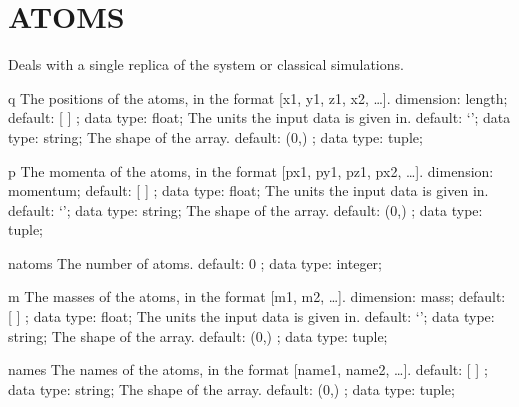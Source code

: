 \section{ATOMS}
\label{ATOMS}
\begin{ipifield}{}%
{Deals with a single replica of the system or classical simulations.}%
{}%
{}
\begin{ipifield}{q}%
{The positions of the atoms, in the format [x1, y1, z1, x2, \ldots  ].}%
{dimension: length; default:  [ ] ; data type: float; }%
{%
{The units the input data is given in.}%
{default: `'; data type: string; }%
%
{The shape of the array.}%
{default:  (0,) ; data type: tuple; }%
}
\end{ipifield}
\begin{ipifield}{p}%
{The momenta of the atoms, in the format [px1, py1, pz1, px2, \ldots  ].}%
{dimension: momentum; default:  [ ] ; data type: float; }%
{%
{The units the input data is given in.}%
{default: `'; data type: string; }%
%
{The shape of the array.}%
{default:  (0,) ; data type: tuple; }%
}
\end{ipifield}
\begin{ipifield}{natoms}%
{The number of atoms.}%
{default:  0 ; data type: integer; }%
{}
\end{ipifield}
\begin{ipifield}{m}%
{The masses of the atoms, in the format [m1, m2, \ldots  ].}%
{dimension: mass; default:  [ ] ; data type: float; }%
{%
{The units the input data is given in.}%
{default: `'; data type: string; }%
%
{The shape of the array.}%
{default:  (0,) ; data type: tuple; }%
}
\end{ipifield}
\begin{ipifield}{names}%
{The names of the atoms, in the format [name1, name2, \ldots  ].}%
{default:  [ ] ; data type: string; }%
{%
{The shape of the array.}%
{default:  (0,) ; data type: tuple; }%
}
\end{ipifield}
\end{ipifield}
